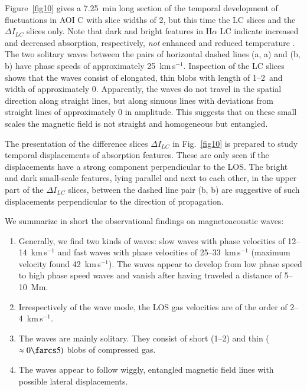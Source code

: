 Figure~\ref{fig10} gives a 7.25~min long section of the temporal development of fluctuations in AOI C with slice widths of 2, but this time the LC slices and the $\Delta I_{LC}$ slices only. Note that dark and bright features in H$\alpha$ LC indicate increased and decreased absorption, {respectively}, {\em not} enhanced and reduced temperature \citep[see][]{2004A&A...418.1131A,2006ApJ...648L..67V}. The two solitary waves between the pairs of horizontal dashed lines (a, a\arcmin) and (b, b\arcmin) have phase speeds of approximately 25~km\,s$^{-1}$. Inspection of the LC slices shows that the waves consist of elongated, thin blobs with length of 1\arcsec--2\arcsec\ and width of approximately 0. Apparently, the waves do not travel in the spatial direction along straight lines, but along sinuous lines with deviations  from straight lines of approximately 0 in amplitude. This suggests that on these small scales the magnetic field is not straight and homogeneous but entangled. 

The presentation of the difference slices $\Delta I_{LC}$ in Fig.~\ref{fig10} is prepared to study temporal displacements of absorption features. These are only seen if the displacements have a strong component perpendicular to the LOS. The bright and dark small-scale features, lying parallel and next to each other, in the upper part of the $\Delta I_{LC}$ slices, between the dashed line pair (b, b\arcmin) are suggestive of such displacements perpendicular to the direction of propagation.


We summarize in short the observational findings on magnetoacoustic waves:
\begin{enumerate}
\item
Generally, we find two kinds of waves: slow waves with phase velocities of 12--14~km\,s$^{-1}$ and fast waves with phase velocities of 25--33~km\,s$^{-1}$ (maximum velocity found 42~km\,s$^{-1}$). The waves appear to develop from low phase speed to high phase speed waves and vanish after having traveled a distance of 5--10~Mm.
\item
Irrespectively of the wave mode, the LOS gas velocities are of the order of 2--4~km\,s$^{-1}$.
\item
The waves are mainly solitary. They consist of short (1\arcsec--2\arcsec) and thin ($\approx0\farcs5)$ blobs of compressed gas.
\item
The waves appear to follow wiggly, entangled magnetic field lines with possible lateral displacements. 
\end{enumerate}

